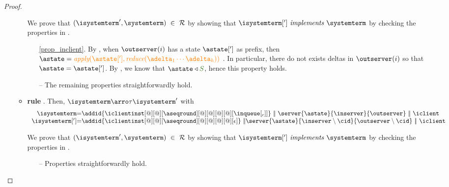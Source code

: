 \begin{proof}
\begin{itemize}
\begin{itemize}
				We  prove that $(\isystemterm',\systemterm) \ \in \ \mathcal{R}$ by showing that $\implements{\isystemterm[']}{\systemterm}$ 
				by checking the properties in .	
				\begin{enumerate}
				
					\item[\ref{prop_inclient}.] By , when $\outserver(i)$ has a state $\astate[']$ as prefix, then $\astate = \iapply{\astate[']}{\ireduce{\adelta_1\cdots\adelta_h}}$ . In particular, there do not exists deltas in $\outserver(i)$ so that $\astate = \astate[']$. By , we know that $\astate \triangleleft \queuemessage$, hence this property holds.
											
						\item[{--}] The remaining properties straightforwardly hold.

					\end{enumerate}

			\item {\bf rule }. Then, $\isystemterm  \arroi{\tau} \isystemterm '$ with 
				\[\begin{array}{r@{=}l}
					\isystemterm & \addid{\iclientinst[@][@][\aseqround][@][@][@][@][\inclient]}
								   \ \bigpar \ \server{\astate}{\inserver}{\outserver} \ \bigpar \ \iclient 	\\
					\isystemterm['] & \addid{\iclientinst[@][@][\aseqround][@][@][@][@][\epsilon]}
									\ \bigpar \server{\astate}{\inserver \setminus\cid}{\outserver \setminus\cid}\ \bigpar \ \iclient 				
					\end{array}
				\]



				We  prove that $(\isystemterm',\systemterm) \ \in \ \mathcal{R}$ by showing that $\implements{\isystemterm[']}{\systemterm}$ 
				by checking the properties in .	
				\begin{enumerate}
							
						\item[{--}] Properties straightforwardly hold.

					\end{enumerate}




\end{itemize}
\end{itemize}
\end{proof}
